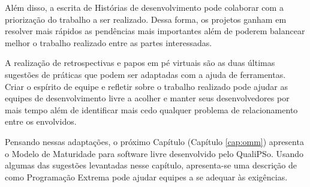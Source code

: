 Além disso, a escrita de Histórias de desenvolvimento pode colaborar
com a priorização do trabalho a ser realizado. Dessa forma, os
projetos ganham em resolver mais rápidos as pendências mais
importantes além de poderem balancear melhor o trabalho realizado
entre as partes interessadas.

A realização de retrospectivas e papos em pé virtuais são as duas
últimas sugestões de práticas que podem ser adaptadas com a ajuda de
ferramentas. Criar o espírito de equipe e refletir sobre o trabalho
realizado pode ajudar as equipes de desenvolvimento livre a acolher e
manter seus desenvolvedores por mais tempo além de identificar mais
cedo qualquer problema de relacionamento entre os envolvidos.

Pensando nessas adaptações, o próximo Capítulo (Capítulo
\ref{cap:omm}) apresenta o Modelo de Maturidade para software livre
desenvolvido pelo QualiPSo. Usando algumas das sugestões levantadas
nesse capítulo, apresenta-se uma descrição de como Programação Extrema
pode ajudar equipes a se adequar às exigências.

